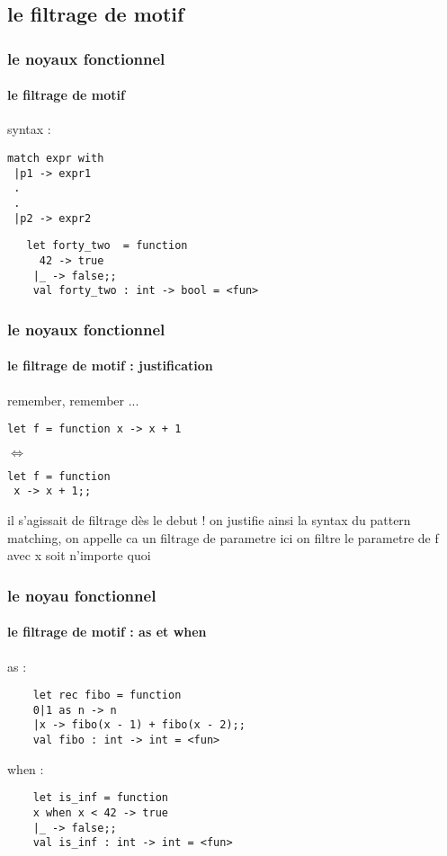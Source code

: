       \subsection{le filtrage de motif}
\begin{frame}[fragile]
  \frametitle{le noyaux fonctionnel}
  \framesubtitle{le filtrage de motif}
  syntax :
  \begin{minipage}[t]{5cm}
    \begin{lstlisting}
match expr with
 |p1 -> expr1
 .
 .
 |p2 -> expr2
 \end{lstlisting}
 \end{minipage}
 \begin{minipage}[t]{8cm}
   \begin{lstlisting}
   let forty_two  = function
     42 -> true
    |_ -> false;;
    val forty_two : int -> bool = <fun>
   \end{lstlisting} 
 \end{minipage}
\end{frame}
\begin{frame}[fragile]
  \frametitle{le noyaux fonctionnel}
  \framesubtitle{le filtrage de motif : justification}
remember, remember ...
\begin{lstlisting}
let f = function x -> x + 1 
\end{lstlisting}
\begin{center}
\begin{rotate}{90}
$\Leftrightarrow$
\end{rotate}
\end{center}
\begin{lstlisting}
let f = function 
 x -> x + 1;;
 \end{lstlisting}
  il s'agissait de filtrage dès le debut ! on justifie ainsi la syntax du pattern matching, 
  on appelle ca un filtrage de parametre ici on filtre le parametre de f avec x soit n'importe quoi
\end{frame}
\begin{frame}[fragile]
  \frametitle{le noyau fonctionnel}
  \framesubtitle{le filtrage de motif : as et when}
  \begin{itemize}
  \begin{minipage}[t]{5cm}
  \item
    as :
    \begin{lstlisting}
	let rec fibo = function 
 	0|1 as n -> n 
 	|x -> fibo(x - 1) + fibo(x - 2);; 
	val fibo : int -> int = <fun>
    \end{lstlisting}
  \end{minipage}
  \begin{minipage}[t]{5cm}
  \item
    when :
    \begin{lstlisting}
	let is_inf = function 
  	x when x < 42 -> true
 	|_ -> false;;
	val is_inf : int -> int = <fun>
    \end{lstlisting}
  \end{minipage}
  \end{itemize}
\end{frame}
